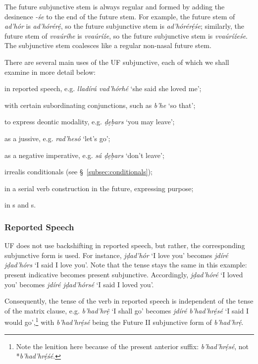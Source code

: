 \documentclass[a4paper, 12pt, twoside, final]{article}
\newlength{\EnumItemSep} \EnumItemSep-3pt
\newenvironment { enum } [1] [0] {
    \vspace { -.5em }
    \settowidth \leftmargini { 99.\hskip\labelsep }
    \begin { enumerate }
    \setcounter { enumi } { #1 }
    \itemsep \EnumItemSep
} {
    \end { enumerate }
    \vspace { -.5em }
}
\let \w \textit
\begin{document}
The future subjunctive stem is always regular and formed by adding the desinence \w{-śe} to the end of the future stem. For example,
the future stem of \w{ad’hór} is \w{ad’hórérẹ́}, so the future subjunctive stem is \w{ad’hórérẹ́śe}; similarly, the future
stem of \w{vvaúríhe} is \w{vvaúríźe}, so the future subjunctive stem is \w{vvaúríźeśe}. The subjunctive stem coalesces like
a regular non-nasal future stem.

There are several main uses of the UF subjunctive, each of which we shall examine in more detail below:
\begin{enum}
\item in reported speech, e.g. \w{lladírá vad’hórhé} ‘she said she loved me’;
\item with certain subordinating conjunctions, such as \w{b’he} ‘so that’;
\item to express deontic modality, e.g. \w{ḍẹḅars} ‘you may leave’;
\item as a jussive, e.g. \w{rad’hesó} ‘let’s go’;
\item as a negative imperative, e.g. \w{sá ḍẹḅars} ‘don’t leave’;
\item irrealis conditionals (see §~\ref{subsec:conditionals});
\item in a serial verb construction in the future, expressing purpose;
\item in s and s.
\end{enum}

\subsubsection{Reported Speech}
UF does not use backshifting in reported speech, but rather, the corresponding subjunctive form is used. For instance,
\w{jḍad’hór} ‘I love you’ becomes \w{jdíré jḍad’hórs} ‘I said I love you’. Note that the tense stays the same in this
example: present indicative becomes present subjunctive. Accordingly, \w{jḍad’hóré} ‘I loved you’ becomes \w{jdíré
jḍad’hórsé} ‘I said I loved you’.

Consequently, the tense of the verb in reported speech is independent of the tense of the matrix clause, e.g.
\w{b’had’hrệ} ‘I shall go’ becomes \w{jdíré b’had’hrẹ́sé} ‘I said I would go’,\footnote{Note the lenition here because
of the present anterior suffix: \w{b’had’hrẹ́sé}, not *\w{b’had’hrẹ́śé}.} with \w{b’had’hrẹ́sé} being the Future II
subjunctive form of \w{b’had’hrẹ́}.
\end{document}
